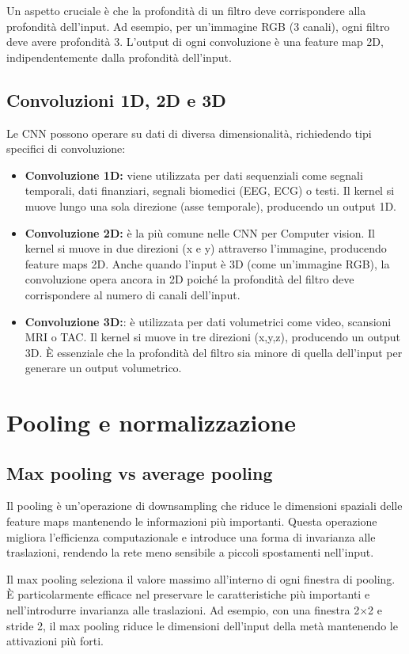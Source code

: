\documentclass[a4paper,12pt]{report}
\begin{document}
	Un aspetto cruciale è che la profondità di un filtro deve corrispondere alla profondità dell'input. Ad esempio, per un'immagine RGB (3 canali), ogni filtro deve avere profondità 3. L'output di ogni convoluzione è una feature map 2D, indipendentemente dalla profondità dell'input.
	
	\subsection{Convoluzioni 1D, 2D e 3D}
	Le CNN possono operare su dati di diversa dimensionalità, richiedendo tipi specifici di convoluzione:
	\begin{itemize}
		\item \textbf{Convoluzione 1D:} viene utilizzata per dati sequenziali come segnali temporali, dati finanziari, segnali biomedici (EEG, ECG) o testi. Il kernel si muove lungo una sola direzione (asse temporale), producendo un output 1D.
		\item \textbf{Convoluzione 2D:} è la più comune nelle CNN per Computer vision. Il kernel si muove in due direzioni (x e y) attraverso l'immagine, producendo feature maps 2D. Anche quando l'input è 3D (come un'immagine RGB), la convoluzione opera ancora in 2D poiché la profondità del filtro deve corrispondere al numero di canali dell'input.
		\item \textbf{Convoluzione 3D:}: è utilizzata per dati volumetrici come video, scansioni MRI o TAC. Il kernel si muove in tre direzioni (x,y,z), producendo un output 3D. È essenziale che la profondità del filtro sia minore di quella dell'input per generare un output volumetrico.
	\end{itemize}
	
	\section{Pooling e normalizzazione}
	
	\subsection{Max pooling vs average pooling}
	Il pooling è un'operazione di downsampling che riduce le dimensioni spaziali delle feature maps mantenendo le informazioni più importanti. Questa operazione migliora l'efficienza computazionale e introduce una forma di invarianza alle traslazioni, rendendo la rete meno sensibile a piccoli spostamenti nell'input.
	
	Il max pooling seleziona il valore massimo all'interno di ogni finestra di pooling. È particolarmente efficace nel preservare le caratteristiche più importanti e nell'introdurre invarianza alle traslazioni. Ad esempio, con una finestra 2$\times$2 e stride 2, il max pooling riduce le dimensioni dell'input della metà mantenendo le attivazioni più forti.
	
\end{document}
